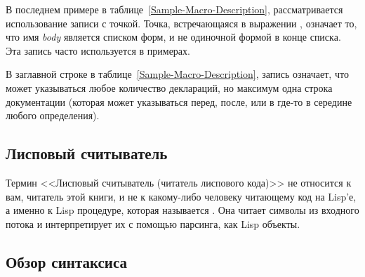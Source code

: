 В последнем примере в таблице~\ref{Sample-Macro-Description}, рассматривается
использование записи с точкой. Точка, встречающаяся в выражении
, означает то, что имя \emph{body}
является списком форм, и не одиночной формой в конце списка. Эта запись 
часто используется в примерах.

\begin{newer}
В заглавной строке в таблице~\ref{Sample-Macro-Description}, запись \Mchoice{~}
означает, что может указываться любое количество деклараций, 
но максимум одна строка документации (которая может указываться перед, после,
или в где-то в середине любого определения).
\end{newer}

\subsection{Лисповый считыватель}

Термин <<Лисповый считыватель (читатель лиспового кода)>> не относится к вам,
читатель этой книги, и не к какому-либо человеку читающему код на Lisp'е, а
именно к Lisp процедуре, которая называется . Она читает символы из
входного потока и интерпретирует их с помощью парсинга, как Lisp объекты.

\subsection{Обзор синтаксиса}

